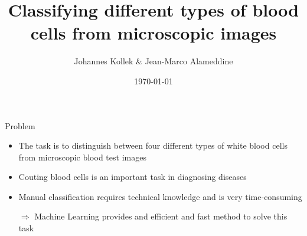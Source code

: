 \documentclass[15pt]{beamer}
\title{Classifying different types of blood cells from microscopic images}
\date{\today}
\author{Johannes Kollek \& Jean-Marco Alameddine}
\institute{Machine Learning for Physicists - TU Dortmund}
\newcommand{\themename}{\textbf{\textsc{metropolis}}\xspace}
\begin{document}
\maketitle


% 








\begin{frame}{Problem}
    \begin{itemize}
      \setlength\itemsep{1em}
      \item The task is to distinguish between four different types of white blood cells from microscopic blood test images
      \item Couting blood cells is an important task in diagnosing diseases
      \item Manual classification requires technical knowledge and is very time-consuming
      \item[$\Rightarrow$] Machine Learning provides and efficient and fast method to solve this task
    \end{itemize}
\end{frame}
\end{document}

